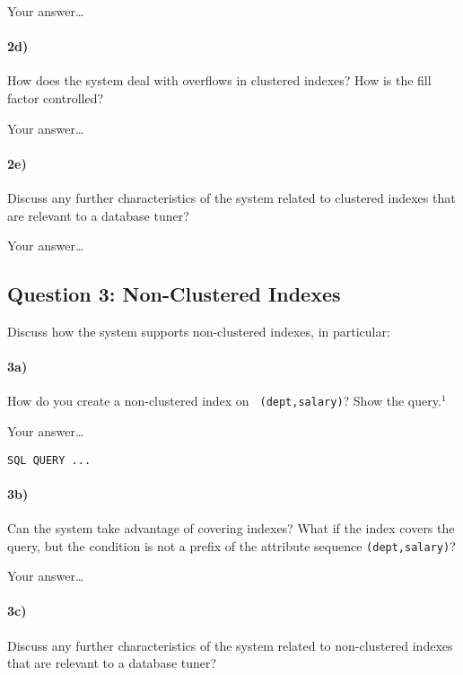 \documentclass[11pt]{scrartcl}
\begin{document}
\smallskip

Your answer\dots

\paragraph{2d)} How does the system deal with overflows in clustered indexes?
How is the fill factor controlled?

\smallskip

Your answer\dots

\paragraph{2e)} Discuss any further characteristics of the system
related to clustered indexes that are relevant to a database
tuner?

\smallskip

Your answer\dots

\subsection*{Question 3: Non-Clustered Indexes}

Discuss how the system supports non-clustered indexes, in
particular:

\paragraph{3a)} How do you create a non-clustered index on {\tt
  (dept,salary)}? Show the query.$^1$

\smallskip

Your answer\dots

{\small
\begin{verbatim}
SQL QUERY ...
\end{verbatim}
}

\paragraph{3b)} Can the system take advantage of covering indexes? What if the
index covers the query, but the condition is not a prefix of the
attribute sequence {\tt (dept,salary)}?


\smallskip

Your answer\dots

\paragraph{3c)} Discuss any further characteristics of the system related to
non-clustered indexes that are relevant to a database tuner?
\end{document}
